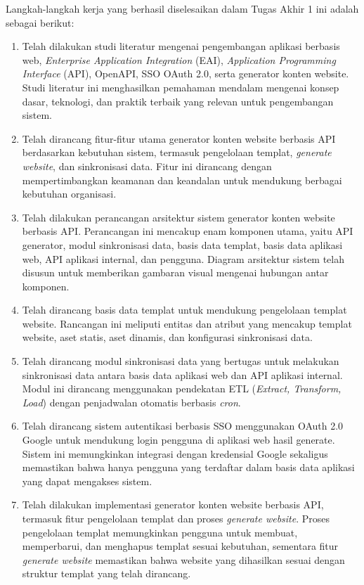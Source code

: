 Langkah-langkah kerja yang berhasil diselesaikan dalam Tugas Akhir 1 ini adalah sebagai berikut:
\begin{enumerate}
    \item Telah dilakukan studi literatur mengenai pengembangan aplikasi berbasis web, \textit{Enterprise Application Integration} (EAI), \textit{Application Programming Interface} (API), OpenAPI, SSO OAuth 2.0, serta generator konten website. Studi literatur ini menghasilkan pemahaman mendalam mengenai konsep dasar, teknologi, dan praktik terbaik yang relevan untuk pengembangan sistem.

    \item Telah dirancang fitur-fitur utama generator konten website berbasis API berdasarkan kebutuhan sistem, termasuk pengelolaan templat, \textit{generate website}, dan sinkronisasi data. Fitur ini dirancang dengan mempertimbangkan keamanan dan keandalan untuk mendukung berbagai kebutuhan organisasi.

    \item Telah dilakukan perancangan arsitektur sistem generator konten website berbasis API. Perancangan ini mencakup enam komponen utama, yaitu API generator, modul sinkronisasi data, basis data templat, basis data aplikasi web, API aplikasi internal, dan pengguna. Diagram arsitektur sistem telah disusun untuk memberikan gambaran visual mengenai hubungan antar komponen.

    \item Telah dirancang basis data templat untuk mendukung pengelolaan templat website. Rancangan ini meliputi entitas dan atribut yang mencakup templat website, aset statis, aset dinamis, dan konfigurasi sinkronisasi data.

    \item Telah dirancang modul sinkronisasi data yang bertugas untuk melakukan sinkronisasi data antara basis data aplikasi web dan API aplikasi internal. Modul ini dirancang menggunakan pendekatan ETL (\textit{Extract, Transform, Load}) dengan penjadwalan otomatis berbasis \textit{cron}.

    \item Telah dirancang sistem autentikasi berbasis SSO menggunakan OAuth 2.0 Google untuk mendukung login pengguna di aplikasi web hasil generate. Sistem ini memungkinkan integrasi dengan kredensial Google sekaligus memastikan bahwa hanya pengguna yang terdaftar dalam basis data aplikasi yang dapat mengakses sistem.

    \item Telah dilakukan implementasi generator konten website berbasis API, termasuk fitur pengelolaan templat dan proses \textit{generate website}. Proses pengelolaan templat memungkinkan pengguna untuk membuat, memperbarui, dan menghapus templat sesuai kebutuhan, sementara fitur \textit{generate website} memastikan bahwa website yang dihasilkan sesuai dengan struktur templat yang telah dirancang.


\end{enumerate}
